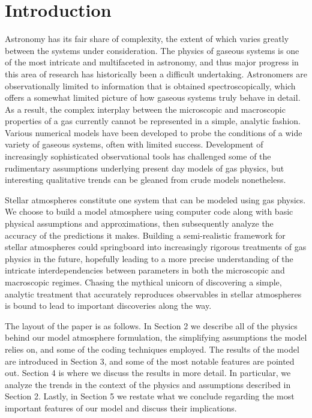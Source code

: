 \documentclass[iop,revtex4]{emulateapj}
\begin{document}
\section{Introduction} \label{intro}
Astronomy has its fair share of complexity, the extent of which varies greatly between the systems under consideration. The physics of gaseous systems is one of the most intricate and multifaceted in astronomy, and thus major progress in this area of research has historically been a difficult undertaking. Astronomers are observationally limited to information that is obtained spectroscopically, which offers a somewhat limited picture of how gaseous systems truly behave in detail. As a result, the complex interplay between the microscopic and macroscopic properties of a gas currently cannot be represented in a simple, analytic fashion. Various numerical models have been developed to probe the conditions of a wide variety of gaseous systems, often with limited success. Development of increasingly sophisticated observational tools has challenged some of the rudimentary assumptions underlying present day models of gas physics, but interesting qualitative trends can be gleaned from crude models nonetheless.
\par
Stellar atmospheres constitute one system that can be modeled using gas physics. We choose to build a model atmosphere using computer code along with basic physical assumptions and approximations, then subsequently analyze the accuracy of the predictions it makes. Building a semi-realistic framework for stellar atmospheres could springboard into increasingly rigorous treatments of gas physics in the future, hopefully leading to a more precise understanding of the intricate interdependencies between parameters in both the microscopic and macroscopic regimes. Chasing the mythical unicorn of discovering a simple, analytic treatment that accurately reproduces observables in stellar atmospheres is bound to lead to important discoveries along the way.

The layout of the paper is as follows. In Section 2 we describe all of the physics behind our model atmosphere formulation, the simplifying assumptions the model relies on, and some of the coding techniques employed. The results of the model are introduced in Section 3, and some of the most notable features are pointed out. Section 4 is where we discuss the results in more detail. In particular, we analyze the trends in the context of the physics and assumptions described in Section 2. Lastly, in Section 5 we restate what we conclude regarding the most important features of our model and discuss their implications. \\
\end{document}

